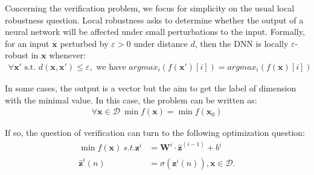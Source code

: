 \documentclass{llncs}
\newcommand{\vx}{\boldsymbol{x}}
\newcommand{\vb}{\boldsymbol{bias}}
\begin{document}

\medskip

Concerning the verification problem, we focus for simplicity on the usual local robustness question. Local robustness asks to determine whether the output of a neural network will be affected under small perturbations to the input. 
Formally, for an input $\vx$ perturbed by $\varepsilon >0$ under distance $d$, then the DNN is locally $\varepsilon$-robust in $\vx$ whenever:
\begin{align*}
	\forall \boldsymbol{x'} \text{ s.t. } d(\vx,\vx')\leq \varepsilon, \text{ we have }  
	argmax_i (f(\boldsymbol{x'})[i]) = argmax_i(f(\boldsymbol{x})[i])
\end{align*} 

\iffalse
In some cases, the output is a vector but the aim to get the label of dimension with the minimal value. In this case, the problem can be written as:\begin{align*}
\forall \boldsymbol{x} \in\mathcal{D} \  \min f(\boldsymbol{x}) = \min f(\boldsymbol{x}_0)
\end{align*}

If so, the question of verification can turn to the following optimization question: \begin{align*}
	\min f(\boldsymbol{x}) \ s.t. {\boldsymbol{z}}^{i} &= \boldsymbol{W}^i\cdot \hat{\boldsymbol{z}}^{(i-1)}+ b^i\\
	\hat{\boldsymbol{z}}^{i}(n) &= \sigma({\boldsymbol{z}}^i(n)), \boldsymbol{x}\in\mathcal{D}.
\end{align*}
\end{document}
